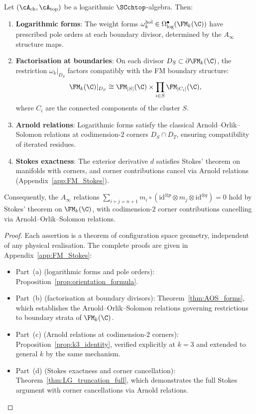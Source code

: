 \begin{theorem}
\label{thm:FM-calculus}
Let $(\cA_{\mathrm{ch}}, \cA_{\mathrm{top}})$ be a logarithmic $\SCchtop$-algebra. Then:
\begin{enumerate}[label=(\alph*)]
\item \textbf{Logarithmic forms}: The weight forms $\omega_k^{\mathrm{hol}} \in \Omega^\bullet_{\log}(\FM_k(\C))$ have prescribed pole orders at each boundary divisor, determined by the $A_\infty$ structure maps.

\item \textbf{Factorisation at boundaries}: On each divisor $D_S \subset \partial \FM_k(\C)$, the restriction $\omega_k|_{D_S}$ factors compatibly with the FM boundary structure:
\[
\FM_k(\C)|_{D_S} \cong \FM_{|S|}(\C) \times \prod_{i \in S} \FM_{|C_i|}(\C),
\]
where $C_i$ are the connected components of the cluster $S$.

\item \textbf{Arnold relations}: Logarithmic forms satisfy the classical Arnold--Orlik--Solomon relations at codimension-$2$ corners $D_S \cap D_T$, ensuring compatibility of iterated residues.

\item \textbf{Stokes exactness}: The exterior derivative $d$ satisfies Stokes' theorem on manifolds with corners, and corner contributions cancel via Arnold relations (Appendix~\ref{app:FM_Stokes}).
\end{enumerate}
Consequently, the $A_\infty$ relations
$\sum_{i+j=n+1} m_i \circ (\mathrm{id}^{\otimes p} \otimes m_j \otimes \mathrm{id}^{\otimes q}) = 0$
hold by Stokes' theorem on $\FM_k(\C)$, with codimension-$2$ corner contributions cancelling via Arnold--Orlik--Solomon relations.
\end{theorem}

\begin{proof}
Each assertion is a theorem of configuration space geometry, independent of any physical realisation. The complete proofs are given in Appendix~\ref{app:FM_Stokes}:
\begin{itemize}
\item Part~(a) (logarithmic forms and pole orders): Proposition~\ref{prop:orientation_formula}.
\item Part~(b) (factorisation at boundary divisors): Theorem~\ref{thm:AOS_forms}, which establishes the Arnold--Orlik--Solomon relations governing restrictions to boundary strata of $\FM_k(\C)$.
\item Part~(c) (Arnold relations at codimension-$2$ corners): Proposition~\ref{prop:k3_identity}, verified explicitly at $k = 3$ and extended to general $k$ by the same mechanism.
\item Part~(d) (Stokes exactness and corner cancellation): Theorem~\ref{thm:LG_truncation_full}, which demonstrates the full Stokes argument with corner cancellations via Arnold relations.
\end{itemize}
\end{proof}

